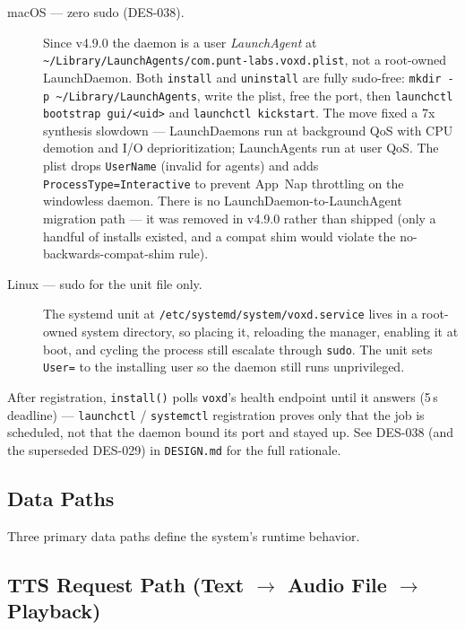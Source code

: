 \documentclass[a4paper,10pt]{article}
\begin{document}
\begin{description}
  \item[macOS --- zero sudo (DES-038).] Since v4.9.0 the daemon is a
    user \emph{LaunchAgent} at
    \texttt{\~{}/Library/LaunchAgents/com.punt-labs.voxd.plist}, not a
    root-owned LaunchDaemon.  Both \texttt{install} and \texttt{uninstall}
    are fully sudo-free: \texttt{mkdir -p \~{}/Library/LaunchAgents},
    write the plist, free the port, then \texttt{launchctl bootstrap
    gui/<uid>} and \texttt{launchctl kickstart}.  The move fixed a 7x
    synthesis slowdown --- LaunchDaemons run at background QoS with CPU
    demotion and I/O deprioritization; LaunchAgents run at user QoS.
    The plist drops \texttt{UserName} (invalid for agents) and adds
    \texttt{ProcessType=Interactive} to prevent App~Nap throttling on
    the windowless daemon.  There is no LaunchDaemon-to-LaunchAgent
    migration path --- it was removed in v4.9.0 rather than shipped
    (only a handful of installs existed, and a compat shim would violate
    the no-backwards-compat-shim rule).
  \item[Linux --- sudo for the unit file only.] The systemd unit at
    \texttt{/etc/systemd/system/voxd.service} lives in a root-owned
    system directory, so placing it, reloading the manager, enabling it
    at boot, and cycling the process still escalate through
    \texttt{sudo}.  The unit sets \texttt{User=} to the installing user
    so the daemon still runs unprivileged.
\end{description}

After registration, \texttt{install()} polls \texttt{voxd}'s health
endpoint until it answers (5\,s deadline) --- \texttt{launchctl} /
\texttt{systemctl} registration proves only that the job is scheduled,
not that the daemon bound its port and stayed up.  See DES-038 (and the
superseded DES-029) in \texttt{DESIGN.md} for the full rationale.

\subsection{Data Paths}

Three primary data paths define the system's runtime behavior.

\subsection{TTS Request Path (Text $\to$ Audio File $\to$ Playback)}
\end{document}
